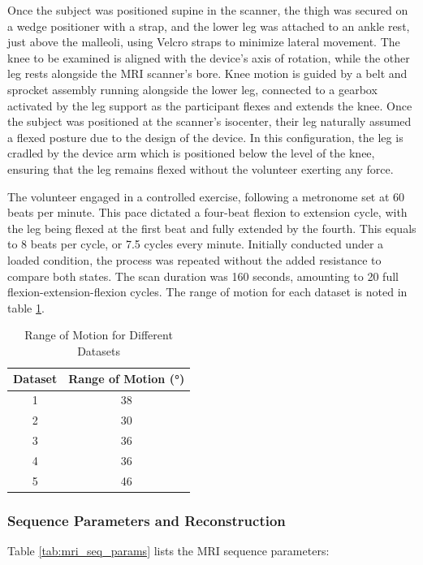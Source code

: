 \documentclass{micro-econ-thesis}
\begin{document}
Once the subject was positioned supine in the scanner, the thigh was secured on a wedge positioner with a strap, and the lower leg was attached to an ankle rest, just above the malleoli, using Velcro straps to minimize lateral movement. The knee to be examined is aligned with the device’s axis of rotation, while the other leg rests alongside the MRI scanner's bore.  Knee motion is guided by a belt and sprocket assembly running alongside the lower leg, connected to a gearbox activated by the leg support as the participant flexes and extends the knee. Once the subject was positioned at the scanner's isocenter, their leg naturally assumed a flexed posture due to the design of the device. In this configuration, the leg is cradled by the device arm which is positioned below the level of the knee, ensuring that the leg remains flexed without the volunteer exerting any force.


The volunteer engaged in a controlled exercise, following a metronome set at 60 beats per minute. This pace dictated a four-beat flexion to extension cycle, with the leg being flexed at the first beat and fully extended by the fourth. This equals to 8 beats per cycle, or 7.5 cycles every minute. Initially conducted under a loaded condition, the process was repeated without the added resistance to compare both states. The scan duration was 160 seconds, amounting to 20 full flexion-extension-flexion cycles. The range of motion for each dataset is noted in table \ref{tab:range_of_motion}. 

\begin{table}[H]
	\centering
	
	\caption{Range of Motion for Different Datasets}
	\label{tab:range_of_motion}
	\begin{tabular}{cc}
		\toprule
		Dataset & Range of Motion (°) \\
		\midrule
		1 & 38 \\
		2 & 30 \\
		3 & 36 \\
		4 & 36 \\
		5 & 46 \\
		\bottomrule
	\end{tabular}
	
	
\end{table}

\subsubsection{Sequence Parameters and Reconstruction}
Table \ref{tab:mri_seq_params} lists the MRI sequence parameters:
\end{document}
